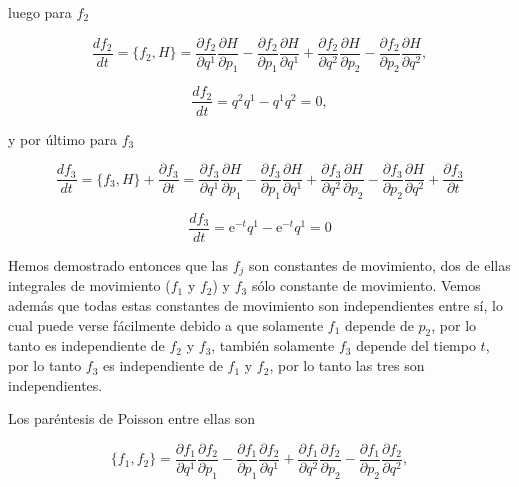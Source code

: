 \documentclass[a4paper,10pt]{article}
\numberwithin{equation}{section}
\newcommand{\euler}{\mathrm{e}}
\begin{document}
luego para $f_2$

\begin{equation}
 \frac{df_2}{dt} = \{f_2,H\} = \frac{\partial f_2}{\partial q^1}\frac{\partial H}{\partial p_1} - 
 \frac{\partial f_2}{\partial p_1}\frac{\partial H}{\partial q^1} +  \frac{\partial f_2}{\partial q^2}\frac{\partial H}{\partial p_2} - 
 \frac{\partial f_2}{\partial p_2}\frac{\partial H}{\partial q^2},
\end{equation}

\begin{equation}
 \frac{df_2}{dt} = q^2q^1 - q^1q^2 = 0,
\end{equation}

y por último para $f_3$

\begin{equation}
\frac{df_3}{dt} = \{f_3,H\} + \frac{\partial f_3}{\partial t} = \frac{\partial f_3}{\partial q^1}\frac{\partial H}{\partial p_1} - 
 \frac{\partial f_3}{\partial p_1}\frac{\partial H}{\partial q^1} +  \frac{\partial f_3}{\partial q^2}\frac{\partial H}{\partial p_2} - 
 \frac{\partial f_3}{\partial p_2}\frac{\partial H}{\partial q^2} + \frac{\partial f_3}{\partial t} 
\end{equation}


\begin{equation}
 \frac{df_3}{dt} = \euler^{-t}q^1 -\euler^{-t}q^1 = 0
\end{equation}

Hemos demostrado entonces que las $f_j$ son constantes de movimiento, dos de ellas 
integrales de movimiento ($f_1$ y $f_2$) y $f_3$ sólo constante de movimiento. Vemos además que 
todas estas constantes de movimiento son independientes entre sí, lo cual puede verse 
fácilmente debido a que solamente $f_1$ depende de $p_2$, por lo tanto es independiente 
de $f_2$ y $f_3$, también solamente $f_3$ depende del tiempo $t$, por lo tanto 
$f_3$ es independiente de $f_1$ y $f_2$, por lo tanto las tres son independientes.

\vspace{.3cm}

Los paréntesis de Poisson entre ellas son

\begin{equation}
 \{f_1,f_2\} = \frac{\partial f_1}{\partial q^1}\frac{\partial f_2}{\partial p_1} - 
 \frac{\partial f_1}{\partial p_1}\frac{\partial f_2}{\partial q^1} +  \frac{\partial f_1}{\partial q^2}\frac{\partial f_2}{\partial p_2} - 
 \frac{\partial f_1}{\partial p_2}\frac{\partial f_2}{\partial q^2},
\end{equation}
\end{document}
